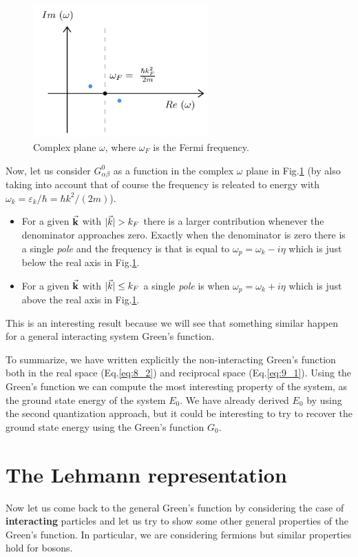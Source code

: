 \documentclass[../main/main.tex]{subfiles}
\begin{document}
\begin{figure}[h!]
\centering
\includegraphics[width=0.6\textwidth]{../lessons/9_image/1.pdf}
\caption{\label{fig:9_1} Complex plane \( \omega  \), where \( \omega _F \) is the Fermi frequency.}
\end{figure}
Now, let us consider \( G^0_{\alpha \beta }  \) as a function in the complex \( \omega  \) plane in Fig.\ref{fig:9_1} (by also taking into account that of course the frequency is releated to energy with \( \omega _k = \varepsilon _k/ \hbar  = \hbar k^2 / (2m) \)).
\begin{itemize}
\item For a given \( \va{k} \) with \( | \vec{k} |  >  k_F \)  there is a larger contribution whenever the denominator approaches zero. Exactly when the denominator is zero there is a single \textit{pole}  and the frequency is that is equal to \( \omega _p = \omega _k - i \eta  \) which is just below the real axis in Fig.\ref{fig:9_1}.

\item For a given \( \va{k} \) with \( | \vec{k} |\le k_F  \) a single \emph{pole} is when \( \omega _p = \omega _k + i \eta  \)  which is just above the real axis in Fig.\ref{fig:9_1}.
\end{itemize}
This is an interesting result because we will see that something similar happen for a general interacting system Green's function.

To summarize, we have written explicitly the non-interacting Green's function both in the real space (Eq.\eqref{eq:8_2}) and reciprocal space (Eq.\eqref{eq:9_1}).
Using the Green's function we can compute the most interesting property of the system, as the ground state energy of the system \( E_0 \). We have already derived \( E_0 \) by using the second quantization approach, but it could be interesting to try to recover the ground state energy using the Green's function \( G_0 \).

\section{The Lehmann representation}
Now let us come back to the general Green's function by considering the case of \textbf{interacting} particles and let us try to show some other general properties of the Green's function. In particular, we are considering fermions but similar properties hold for bosons.
\end{document}
